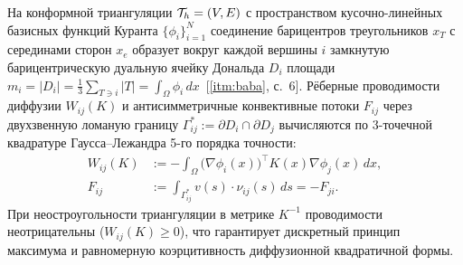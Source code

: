 На конформной триангуляции $\mathcal{T}_h=(V,E)$ с пространством кусочно-линейных базисных функций Куранта $\{\phi_i\}_{i=1}^N$ соединение барицентров треугольников $x_T$ с серединами сторон $x_e$ образует вокруг каждой вершины $i$ замкнутую барицентрическую дуальную ячейку Дональда $D_i$ площади $m_i=|D_i|=\frac{1}{3}\sum_{T\ni i}|T|=\int_\Omega\phi_i\,dx$~[\ref{itm:baba}, с.~6]. Рёберные проводимости диффузии $W_{ij}(K)$ и антисимметричные конвективные потоки $F_{ij}$ через двухзвенную ломаную границу $\Gamma_{ij}^*:=\partial D_i\cap\partial D_j$ вычисляются по 3-точечной квадратуре Гаусса--Лежандра 5-го порядка точности:
\begin{equation}\label{eq:oit_weights}
\begin{aligned}
W_{ij}(K) &:= -\int_\Omega \bigl(\nabla\phi_i(x)\bigr)^\top K(x)\nabla\phi_j(x)\,dx,\\
F_{ij} &:= \int_{\Gamma_{ij}^*} v(s)\cdot\nu_{ij}(s)\,ds = -F_{ji}.
\end{aligned}
\end{equation}
При неостроугольности триангуляции в метрике $K^{-1}$ проводимости неотрицательны ($W_{ij}(K)\ge 0$), что гарантирует дискретный принцип максимума и равномерную коэрцитивность диффузионной квадратичной формы.


